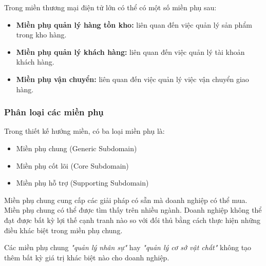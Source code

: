 \begin{example} Trong miền thương mại điện tử lớn có thể có một số miền phụ sau:

    \begin{itemize}

        \item \textbf{Miền phụ quản lý hàng tồn kho:} liên quan đến việc quản lý sản phẩm trong kho hàng.

        \item \textbf{Miền phụ quản lý khách hàng:} liên quan đến việc quản lý tài khoản khách hàng.

        \item \textbf{Miền phụ vận chuyển:} liên quan đến việc quản lý việc vận chuyển giao hàng.

    \end{itemize}

\end{example}

\subsubsection{Phân loại các miền phụ} \label{subsubsection:511}

Trong thiết kế hướng miền, có ba loại miền phụ là:

\begin{itemize}

    \item Miền phụ chung (Generic Subdomain)

    \item Miền phụ cốt lõi (Core Subdomain)

    \item Miền phụ hỗ trợ (Supporting Subdomain)

\end{itemize}


Miền phụ chung cung cấp các giải pháp có sẵn mà doanh nghiệp có thể mua. Miền phụ chung có thể được tìm thấy trên nhiều ngành. Doanh nghiệp không thể đạt được bất kỳ lợi thế cạnh tranh nào so với đối thủ bằng cách thực hiện những điều khác biệt trong miền phụ chung.

\begin{example} Các miền phụ chung \textit{"quản lý nhân sự"} hay \textit{"quản lý cơ sở vật chất"} không tạo thêm bất kỳ giá trị khác biệt nào cho doanh nghiệp.

\end{example}

